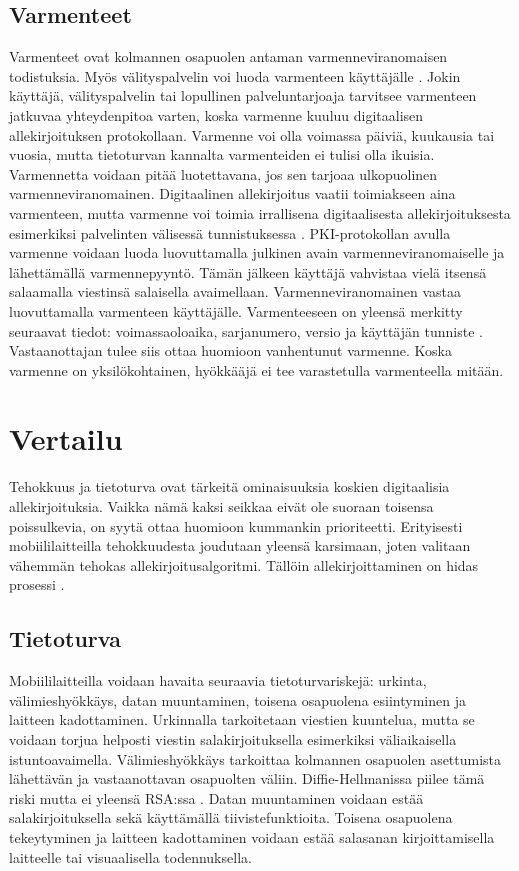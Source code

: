 \documentclass[finnish]{tktltiki2}
\theoremstyle{definition}
\theoremstyle{remark}
\begin{document}
\subsection{Varmenteet}

Varmenteet ovat kolmannen osapuolen antaman varmenneviranomaisen todistuksia. Myös välityspalvelin voi luoda varmenteen käyttäjälle \cite{proxy}. Jokin käyttäjä, välityspalvelin tai lopullinen palveluntarjoaja tarvitsee varmenteen jatkuvaa yhteydenpitoa varten, koska varmenne kuuluu digitaalisen allekirjoituksen protokollaan. Varmenne voi olla voimassa päiviä, kuukausia tai vuosia, mutta tietoturvan kannalta varmenteiden ei tulisi olla ikuisia. Varmennetta voidaan pitää luotettavana, jos sen tarjoaa ulkopuolinen varmenneviranomainen. Digitaalinen allekirjoitus vaatii toimiakseen aina varmenteen, mutta varmenne voi toimia irrallisena digitaalisesta allekirjoituksesta esimerkiksi palvelinten välisessä tunnistuksessa \cite{proxy}. PKI-protokollan avulla varmenne voidaan luoda luovuttamalla julkinen avain varmenneviranomaiselle ja lähettämällä varmennepyyntö. Tämän jälkeen käyttäjä vahvistaa vielä itsensä salaamalla viestinsä salaisella avaimellaan. Varmenneviranomainen vastaa luovuttamalla varmenteen käyttäjälle. Varmenteeseen on yleensä merkitty seuraavat tiedot: voimassaoloaika, sarjanumero, versio ja käyttäjän tunniste \cite{ECC}. Vastaanottajan tulee siis ottaa huomioon vanhentunut varmenne. Koska varmenne on yksilökohtainen, hyökkääjä ei tee varastetulla varmenteella mitään. 

\section{Vertailu}

Tehokkuus ja tietoturva ovat tärkeitä ominaisuuksia koskien digitaalisia allekirjoituksia. Vaikka nämä kaksi seikkaa eivät ole suoraan toisensa poissulkevia, on syytä ottaa huomioon kummankin prioriteetti. Erityisesti mobiililaitteilla tehokkuudesta joudutaan yleensä karsimaan, joten valitaan vähemmän tehokas allekirjoitusalgoritmi. Tällöin allekirjoittaminen on hidas prosessi \cite{proxy}.

\subsection{Tietoturva}

Mobiililaitteilla voidaan havaita seuraavia tietoturvariskejä: urkinta, välimieshyökkäys, datan muuntaminen, toisena osapuolena esiintyminen ja laitteen kadottaminen. Urkinnalla tarkoitetaan viestien kuuntelua, mutta se voidaan torjua helposti viestin salakirjoituksella esimerkiksi väliaikaisella istuntoavaimella. Välimieshyökkäys tarkoittaa kolmannen osapuolen asettumista lähettävän ja vastaanottavan osapuolten väliin. Diffie-Hellmanissa piilee tämä riski mutta ei yleensä RSA:ssa \cite{enti}. Datan muuntaminen voidaan estää salakirjoituksella sekä käyttämällä tiivistefunktioita. Toisena osapuolena tekeytyminen ja laitteen kadottaminen voidaan estää salasanan kirjoittamisella laitteelle tai visuaalisella todennuksella. 
\end{document}
